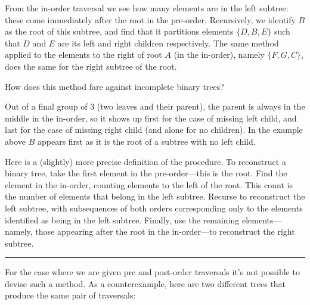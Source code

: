 \documentclass{report}
\newcommand{\okthen}{\rule[-1.4pt]{0.3em}{0.77em}}
\begin{document}
From the in-order traversal we see how many elements are in the left subtree: these come immediately after the root in the pre-order. Recursively, we identify $B$ as the root of this subtree, and find that it partitions elements $\{D,B,E\}$ such that $D$ and $E$ are its left and right children respectively. The same method applied to the elements to the right of root $A$ (in the in-order), namely $\{F,G,C\}$, does the same for the right subtree of the root.

How does this method fare against incomplete binary trees?
\begin{center}
\end{center}
Out of a final group of 3 (two leaves and their parent), the parent is always in the middle in the in-order, so it shows up first for the case of missing left child, and last for the case of missing right child (and alone for no children). In the example above %
$B$ appears first as it is the root of a subtree with no left child.

\smallskip

Here is a (slightly) more precise definition of the procedure. To reconstruct a binary tree, take the first element in the pre-order---this is the root. Find the element in the in-order, counting elements to the left of the root. This count is the number of elements that belong in the left subtree. Recurse to reconstruct the left subtree, with subsequences of both orders corresponding only to the elements identified as being in the left subtree. Finally, use the remaining elements---namely, those appearing after the root in the in-order---to reconstruct the right subtree.\ \okthen

\smallskip

For the case where we are given pre and post-order traversals it's not possible to devise such a method. As a counterexample, here are two different trees that produce the same pair of traversals:
\begin{center}
\hspace{.7cm}
\end{center}
\end{document}
